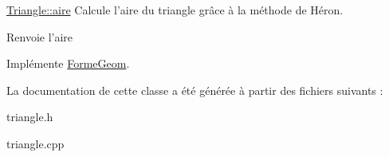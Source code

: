 \hyperlink{class_triangle_ab8f3ee5da959716a0d08f5a1206ff8bf}{Triangle\+::aire} Calcule l'aire du triangle grâce à la méthode de Héron. 

\begin{DoxyReturn}{Renvoie}
l'aire 
\end{DoxyReturn}


Implémente \hyperlink{class_forme_geom}{Forme\+Geom}.



La documentation de cette classe a été générée à partir des fichiers suivants \+:\begin{DoxyCompactItemize}
\item 
triangle.\+h\item 
triangle.\+cpp\end{DoxyCompactItemize}
